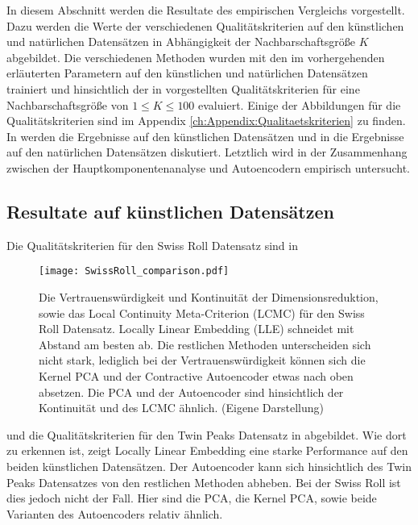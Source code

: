 In diesem Abschnitt werden die Resultate des empirischen Vergleichs vorgestellt. Dazu werden die
Werte der verschiedenen Qualitätskriterien auf den künstlichen und natürlichen Datensätzen in
Abhängigkeit der Nachbarschaftsgröße $K$ abgebildet. Die verschiedenen Methoden wurden mit den im
vorhergehenden  erläuterten Parametern auf
den künstlichen und natürlichen Datensätzen trainiert und hinsichtlich der in
 vorgestellten Qualitätskriterien für
eine Nachbarschaftsgröße von $1 \leq K \leq 100$ evaluiert. Einige der Abbildungen für die
Qualitätskriterien sind im Appendix \ref{ch:Appendix:Qualitaetskriterien} zu finden. In
 werden die Ergebnisse auf den künstlichen
Datensätzen und in  die Ergebnisse auf den
natürlichen Datensätzen diskutiert. Letztlich wird in 
der Zusammenhang zwischen der Hauptkomponentenanalyse und Autoencodern empirisch untersucht.

\subsection{Resultate auf künstlichen Datensätzen}
\label{ch:Vergleich:sec:Resultate:kuenstlich}

Die Qualitätskriterien für den Swiss Roll Datensatz sind in 
\begin{figure}[ht]
	\begin{center}
		\texttt{[image: SwissRoll\_comparison.pdf]}
	\end{center}
	\caption[Qualitätskriterien für die Swiss Roll]{Die Vertrauenswürdigkeit und Kontinuität der Dimensionsreduktion, sowie das Local Continuity Meta-Criterion (LCMC) für den Swiss Roll Datensatz. Locally Linear Embedding (LLE) schneidet mit Abstand am besten ab. Die restlichen Methoden unterscheiden sich nicht stark, lediglich bei der Vertrauenswürdigkeit können sich die Kernel PCA und der Contractive Autoencoder etwas nach oben absetzen. Die PCA und der Autoencoder sind hinsichtlich der Kontinuität und des LCMC ähnlich. (Eigene Darstellung)}
	\label{fig:SwissRollMetrics}
\end{figure}
und die Qualitätskriterien für den Twin Peaks Datensatz in  abgebildet. Wie dort zu erkennen ist, zeigt Locally Linear Embedding eine starke Performance auf den beiden künstlichen Datensätzen. Der Autoencoder kann sich hinsichtlich des Twin Peaks Datensatzes von den restlichen Methoden abheben. Bei der Swiss Roll ist dies jedoch nicht der Fall. Hier sind die PCA, die Kernel PCA, sowie beide Varianten des Autoencoders relativ ähnlich.

